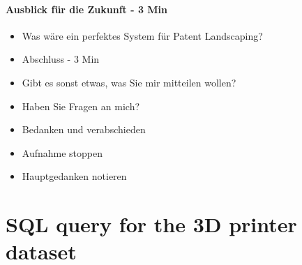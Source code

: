 \paragraph{Ausblick für die Zukunft - 3 Min}

\begin{itemize}
\item Was wäre ein perfektes System für Patent Landscaping?
\item Abschluss - 3 Min
\item Gibt es sonst etwas, was Sie mir mitteilen wollen?
\item Haben Sie Fragen an mich?
\item Bedanken und verabschieden
\item Aufnahme stoppen
\item Hauptgedanken notieren
\end{itemize}

\section{SQL query for the 3D printer dataset}
\label{sec:3d_printer_query}

